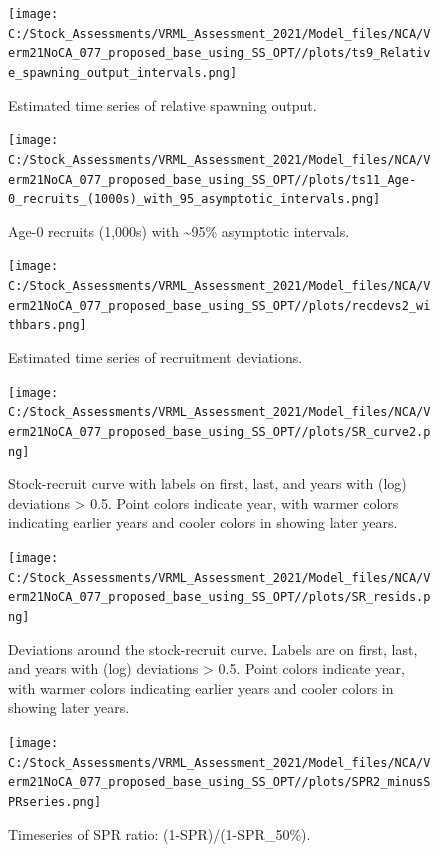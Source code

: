 \documentclass[
  english,
  a4paper,
]{article}
\begin{document}
\begin{figure}
\centering
\texttt{[image: C:/Stock\_Assessments/VRML\_Assessment\_2021/Model\_files/NCA/Verm21NoCA\_077\_proposed\_base\_using\_SS\_OPT//plots/ts9\_Relative\_spawning\_output\_intervals.png]}
\caption{Estimated time series of relative spawning output.\label{fig:depl}}
\end{figure}

\FloatBarrier

\begin{figure}
\centering
\texttt{[image: C:/Stock\_Assessments/VRML\_Assessment\_2021/Model\_files/NCA/Verm21NoCA\_077\_proposed\_base\_using\_SS\_OPT//plots/ts11\_Age-0\_recruits\_(1000s)\_with\_95\_asymptotic\_intervals.png]}
\caption{Age-0 recruits (1,000s) with \textasciitilde95\% asymptotic intervals.\label{fig:recruits}}
\end{figure}

\begin{figure}
\centering
\texttt{[image: C:/Stock\_Assessments/VRML\_Assessment\_2021/Model\_files/NCA/Verm21NoCA\_077\_proposed\_base\_using\_SS\_OPT//plots/recdevs2\_withbars.png]}
\caption{Estimated time series of recruitment deviations.\label{fig:rec-devs}}
\end{figure}

\begin{figure}
\centering
\texttt{[image: C:/Stock\_Assessments/VRML\_Assessment\_2021/Model\_files/NCA/Verm21NoCA\_077\_proposed\_base\_using\_SS\_OPT//plots/SR\_curve2.png]}
\caption{Stock-recruit curve with labels on first, last, and years with (log) deviations \textgreater{} 0.5. Point colors indicate year, with warmer colors indicating earlier years and cooler colors in showing later years.\label{fig:bh-curve}}
\end{figure}

\begin{figure}
\centering
\texttt{[image: C:/Stock\_Assessments/VRML\_Assessment\_2021/Model\_files/NCA/Verm21NoCA\_077\_proposed\_base\_using\_SS\_OPT//plots/SR\_resids.png]}
\caption{Deviations around the stock-recruit curve. Labels are on first, last, and years with (log) deviations \textgreater{} 0.5. Point colors indicate year, with warmer colors indicating earlier years and cooler colors in showing later years.\label{fig:bh-resids}}
\end{figure}

\begin{figure}
\centering
\texttt{[image: C:/Stock\_Assessments/VRML\_Assessment\_2021/Model\_files/NCA/Verm21NoCA\_077\_proposed\_base\_using\_SS\_OPT//plots/SPR2\_minusSPRseries.png]}
\caption{Timeseries of SPR ratio: (1-SPR)/(1-SPR\_50\%).\label{fig:1-spr}}
\end{figure}
\end{document}
